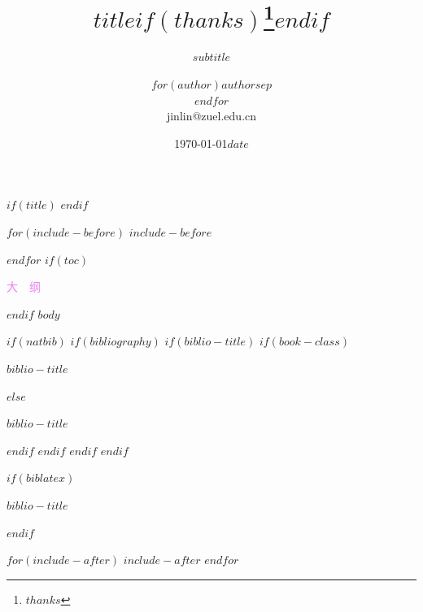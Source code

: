 \documentclass[$if(fontsize)$$fontsize$,$endif$$if(lang)$$babel-lang$,$endif$$if(handout)$handout,$endif$$if(beamer)$ignorenonframetext,11pt,xcolor=dvipsnames,hyperref={colorlinks,allcolors=.,urlcolor=blue, citecolor=violet, bookmarksdepth=4},$endif$$for(classoption)$$classoption$$sep$,$endfor$]{$documentclass$}
\author[$for(author)$$author$$sep$ \\ $endfor$]{\CJKfamily{kai}$for(author)$$author$$sep$ \\ $endfor$ \\ jinlin@zuel.edu.cn \\}
\institute[$for(institute)$$institute$$sep$ \and $endfor$]{\normalsize\CJKfamily{kai}$for(institute)$$institute$$sep$ \and $endfor$}
\date{\today}
\date{$date$}
\title{$title$$if(thanks)$\thanks{$thanks$}$endif$}
\subtitle{$subtitle$}
\renewcommand{\refname}{参考文献}            %
\begin{document}
$if(title)$
\frame{\titlepage}
$endif$

$for(include-before)$
$include-before$

$endfor$
$if(toc)$
\begin{frame}{\textcolor{violet}{\normalfont\Large {}大\ \ 纲 }} \textcolor{violet}{}
\tableofcontents[hideallsubsections]
\end{frame}

$endif$
$body$

$if(natbib)$
$if(bibliography)$
$if(biblio-title)$
$if(book-class)$

\renewcommand\bibname{$biblio-title$}
\begin{frame}[allowframebreaks]{$biblio-title$}
\footnotesize{}

\end{frame}

$else$

\renewcommand\refname{$biblio-title$}
\begin{frame}[allowframebreaks]{$biblio-title$}
\footnotesize{}

\end{frame}

$endif$
$endif$
$endif$
$endif$

$if(biblatex)$
\begin{frame}[allowframebreaks]{$biblio-title$}
\footnotesize{}
\printbibliography[heading=none]
\end{frame}
$endif$

$for(include-after)$
$include-after$
$endfor$
\end{document}
